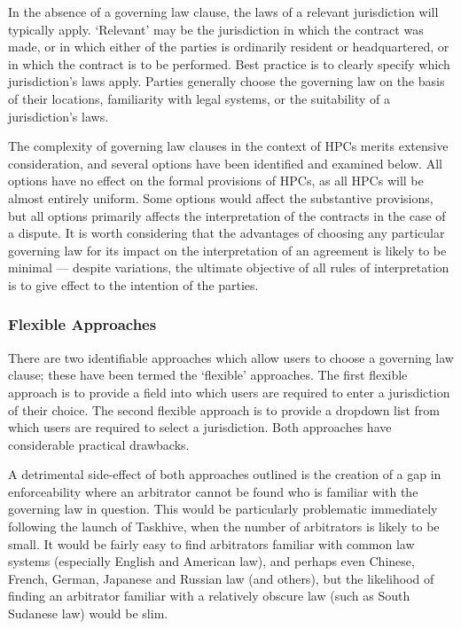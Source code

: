 \documentclass[a4paper,12pt]{article}
\begin{document}
In the absence of a governing law clause, the laws of a relevant jurisdiction will typically apply. `Relevant' may be the jurisdiction in which the contract was made, or in which either of the parties is ordinarily resident or headquartered, or in which the contract is to be performed. Best practice is to clearly specify which jurisdiction's laws apply. Parties generally choose the governing law on the basis of their locations, familiarity with legal systems, or the suitability of a jurisdiction's laws.

The complexity of governing law clauses in the context of HPCs merits extensive consideration, and several options have been identified and examined below. All options have no effect on the formal provisions of HPCs, as all HPCs will be almost entirely uniform. Some options would affect the substantive provisions, but all options primarily affects the interpretation of the contracts in the case of a dispute. It is worth considering that the advantages of choosing any particular governing law for its impact on the interpretation of an agreement is likely to be minimal --- despite variations, the ultimate objective of all rules of interpretation is to give effect to the intention of the parties.

\subsubsection{Flexible Approaches}

There are two identifiable approaches which allow users to choose a governing law clause; these have been termed the `flexible' approaches. The first flexible approach is to provide a field into which users are required to enter a jurisdiction of their choice. The second flexible approach is to provide a dropdown list from which users are required to select a jurisdiction. Both approaches have considerable practical drawbacks.

A detrimental side-effect of both approaches outlined is the creation of a gap in enforceability where an arbitrator cannot be found who is familiar with the governing law in question. This would be particularly problematic immediately following the launch of Taskhive, when the number of arbitrators is likely to be small. It would be fairly easy to find arbitrators familiar with common law systems (especially English and American law), and perhaps even Chinese, French, German, Japanese and Russian law (and others), but the likelihood of finding an arbitrator familiar with a relatively obscure law (such as South Sudanese law) would be slim.
\end{document}
